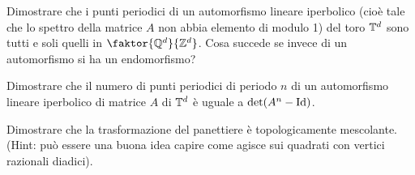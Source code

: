 \begin{exercise}
    Dimostrare che i punti periodici di un automorfismo lineare iperbolico (cioè tale che lo spettro della matrice $ A $ non abbia elemento di modulo 1) del toro $ \mathbb{T}^d $ sono tutti e soli quelli in $ \faktor{\Q^d}{\Z^d} $. Cosa succede se invece di un automorfismo si ha un endomorfismo?
\end{exercise}

\begin{exercise}
    Dimostrare che il numero di punti periodici di periodo $ n $ di un automorfismo lineare iperbolico di matrice $ A $ di $ \mathbb{T}^d $ è uguale a $ \det(A^n - \mathrm{Id}) $.    
\end{exercise}

\begin{exercise}
    Dimostrare che la trasformazione del panettiere è topologicamente mescolante. (Hint: può essere una buona idea capire come agisce sui quadrati con vertici razionali diadici).
\end{exercise}

